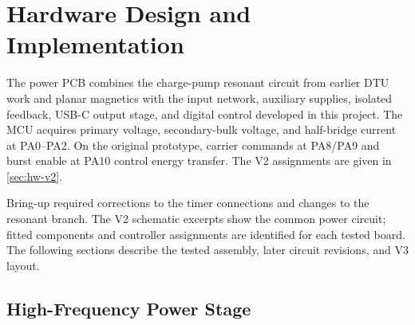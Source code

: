 \chapter{Hardware Design and Implementation}
\label{ch:hardware}

The power PCB combines the charge-pump resonant circuit from earlier DTU work and planar magnetics with the input network, auxiliary supplies, isolated feedback, USB-C output stage, and digital control developed in this project. The MCU acquires primary voltage, secondary-bulk voltage, and half-bridge current at PA0--PA2. On the original prototype, carrier commands at PA8/PA9 and burst enable at PA10 control energy transfer. The V2 assignments are given in \cref{sec:hw-v2}.

Bring-up required corrections to the timer connections and changes to the resonant branch. The V2 schematic excerpts show the common power circuit; fitted components and controller assignments are identified for each tested board. The following sections describe the tested assembly, later circuit revisions, and V3 layout.



\section{High-Frequency Power Stage}
\label{sec:hw-powerstage}

















